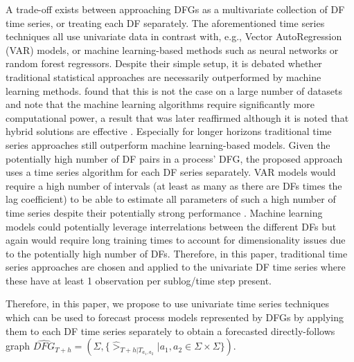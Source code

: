 A trade-off exists between approaching DFGs as a multivariate collection of DF time series, or treating each DF separately.
The aforementioned time series techniques all use univariate data in contrast with, e.g., Vector AutoRegression (VAR) models, or machine learning-based methods such as neural networks or random forest regressors.
Despite their simple setup, it is debated whether traditional statistical approaches are necessarily outperformed by machine learning methods. 
\cite{makridakis2018statistical} found that this is not the case on a large number of datasets and note that the machine learning algorithms require significantly more computational power, a result that was later reaffirmed although it is noted that hybrid solutions are effective \cite{makridakis2020m4}.
Especially for longer horizons traditional time series approaches still outperform machine learning-based models.
Given the potentially high number of DF pairs in a process' DFG, the proposed approach uses a time series algorithm for each DF series separately.
VAR models would require a high number of intervals (at least as many as there are DFs times the lag coefficient) to be able to estimate all parameters of such a high number of time series despite their potentially strong performance \cite{thomakos2004naive}.
Machine learning models could potentially leverage interrelations between the different DFs but again would require long training times to account for dimensionality issues due to the potentially high number of DFs. Therefore, in this paper, traditional time series approaches are chosen and applied to the univariate DF time series where these have at least 1 observation per sublog/time step present.

Therefore, in this paper, we propose to use univariate time series techniques which can be used to forecast process models represented by DFGs by applying them to each DF time series separately to obtain a forecasted directly-follows graph $\widehat{DFG}_{T+h}=(\Sigma,\{\hat{>}_{T+h|T_{a_1,a_2}}|a_1,a_2\in \Sigma\times\Sigma\})$.

